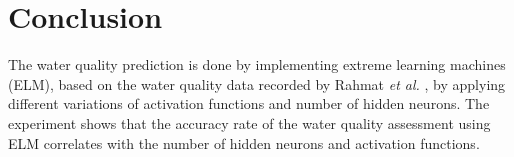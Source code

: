 \documentclass[journal,comsoc]{IEEEtran}
\let\MYoriglatexcaption\caption
\renewcommand{\caption}[2][\relax]{\MYoriglatexcaption[#2]{#2}}
\begin{document}
%



\section{Conclusion}
The water quality prediction is done by implementing extreme learning machines (ELM), based on the water quality data recorded by Rahmat {\it et al.} \cite{Rahmat16} , by applying different variations of activation functions and number of hidden neurons. The experiment shows that the accuracy rate of the water quality assessment using ELM correlates with the number of hidden neurons and activation functions.
\end{document}
